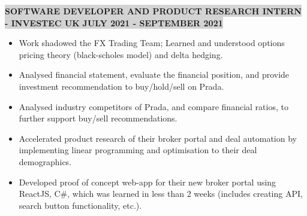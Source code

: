 \documentclass[10pt]{article}
\begin{document}
\vspace{-0.5cm}
\begin{center}
{{\colorbox{lightgrey}{\textbf{SOFTWARE DEVELOPER AND PRODUCT RESEARCH INTERN - INVESTEC UK }  \quad \qquad \qquad  \qquad \quad \qquad\textbf{JULY 2021 - SEPTEMBER 2021}}}}
\end{center}
\vspace{-0.6cm}
\begin{itemize}
\setlength\itemsep{0.1em}
    \item Work shadowed the FX Trading Team; Learned and understood options pricing theory (black-scholes model) and delta hedging.
    \item Analysed financial statement, evaluate the financial position, and provide investment recommendation to buy/hold/sell on Prada.
    \item Analysed industry competitors of Prada, and compare financial ratios, to further support buy/sell recommendations.
    \item Accelerated product research of their broker portal and deal automation by implementing linear programming and optimisation to their deal demographics.
    \item Developed proof of concept web-app for their new broker portal using ReactJS, C\#, which was learned in less than 2 weeks (includes creating API, search button functionality, etc.).
\end{itemize}

\begin{comment}
\begin{center}
{{\fontfamily{lmtt}\colorbox{lightgrey}{\textbf{VOLUNTEER TUTOR - IMPERIAL COLLEGE PIMLICO CONNECTION } \qquad   \quad \qquad \qquad \qquad\qquad \quad \qquad\textbf{OCTOBER 2019 - APRIL 2021}}}}
\end{center}
\begin{itemize}
    \item Taught Physics, Mathematics and Further Mathematics to Year 13 students who can't afford private tutoring.
    \item Developed excellent communication skills by breaking down difficult mathematical concepts to pre-university students.
\end{itemize}
\end{comment}

\vspace{-0.5cm}
\end{document}
